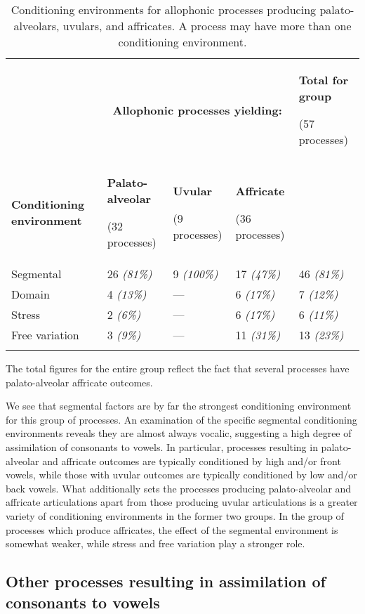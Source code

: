 \begin{table}
\begin{tabularx}{\textwidth}{XXXXX}
\lsptoprule
 & \multicolumn{3}{c}{ \textbf{Allophonic processes yielding:}} & { \textbf{Total for group}}

 (57 processes)\\
 \textbf{Conditioning environment} & { \textbf{Palato-alveolar}}

 (32 processes) & { \textbf{Uvular}}

 (9 processes) & { \textbf{Affricate}}

 (36 processes) & \\
 Segmental & 26 \textit{(81\%)} & 9 \textit{(100\%)} & 17 \textit{(47\%)} & 46 \textit{(81\%)}\\
 Domain & 4 \textit{(13\%)} & — & 6 \textit{(17\%)} & 7 \textit{(12\%)}\\
 Stress & 2 \textit{(6\%)} & — & 6 \textit{(17\%)} & 6 \textit{(11\%)}\\
 Free variation & 3 \textit{(9\%)} & — & 11 \textit{(31\%)} & 13 \textit{(23\%)}\\
\lspbottomrule
\end{tabularx}
\caption{\label{tab:7.2}Conditioning environments for allophonic processes producing palato-alveolars, uvulars, and affricates. A process may have more than one conditioning environment.}The total figures for the entire group reflect the fact that several processes have palato-alveolar affricate outcomes.
\end{table}

  We see that segmental factors are by far the strongest conditioning environment for this group of processes. An examination of the specific segmental conditioning environments reveals they are almost always vocalic, suggesting a high degree of assimilation of consonants to vowels.  In particular, processes resulting in palato-alveolar and affricate outcomes are typically conditioned by high and/or front vowels, while those with uvular outcomes are typically conditioned by low and/or back vowels. What additionally sets the processes producing palato-alveolar and affricate articulations apart from those producing uvular articulations is a greater variety of conditioning environments in the former two groups. In the group of processes which produce affricates, the effect of the segmental environment is somewhat weaker, while stress and free variation play a stronger role.

\subsection{Other processes resulting in assimilation of consonants to vowels}\label{sec:7.3.3}

